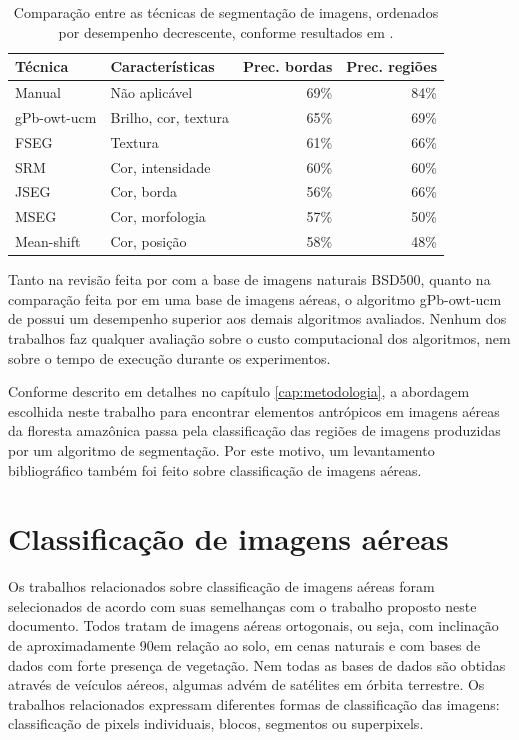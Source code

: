 \begin{table}[h]
\centering
\begin{tabulary}{\linewidth}{|L|L|R|R|}
\hline
\textbf{Técnica} & \textbf{Características} & \textbf{Prec. bordas} & \textbf{Prec. regiões } \\ \hline
Manual      & Não aplicável        & 69\% & 84\% \\ \hline
gPb-owt-ucm & Brilho, cor, textura & 65\% & 69\% \\ \hline
FSEG        & Textura              & 61\% & 66\% \\ \hline
SRM         & Cor, intensidade     & 60\% & 60\% \\ \hline
JSEG        & Cor, borda           & 56\% & 66\% \\ \hline
MSEG        & Cor, morfologia      & 57\% & 50\% \\ \hline
Mean-shift  & Cor, posição         & 58\% & 48\% \\ \hline
\end{tabulary}
\caption{Comparação entre as técnicas de segmentação de imagens, ordenados por desempenho decrescente, conforme resultados em .}
\label{tab:sumarioSegmentacao}
\end{table}

Tanto na revisão feita por  com a base de imagens naturais BSD500, quanto na comparação feita por  em uma base de imagens aéreas, o algoritmo gPb-owt-ucm de  possui um desempenho superior aos demais algoritmos avaliados. Nenhum dos trabalhos faz qualquer avaliação sobre o custo computacional dos algoritmos, nem sobre o tempo de execução durante os experimentos.

Conforme descrito em detalhes no capítulo \ref{cap:metodologia}, a abordagem escolhida neste trabalho para encontrar elementos antrópicos em imagens aéreas da floresta amazônica passa pela classificação das regiões de imagens produzidas por um algoritmo de segmentação. Por este motivo, um levantamento bibliográfico também foi feito sobre classificação de imagens aéreas.

\section{Classificação de imagens aéreas}\label{sec:trClassificacao}

Os trabalhos relacionados sobre classificação de imagens aéreas foram selecionados de acordo com suas semelhanças com o trabalho proposto neste documento. Todos tratam de imagens aéreas ortogonais, ou seja, com inclinação de aproximadamente 90\degree em relação ao solo, em cenas naturais e com bases de dados com forte presença de vegetação. Nem todas as bases de dados são obtidas através de veículos aéreos, algumas advém de satélites em órbita terrestre. Os trabalhos relacionados expressam diferentes formas de classificação das imagens: classificação de pixels individuais, blocos, segmentos ou superpixels.

